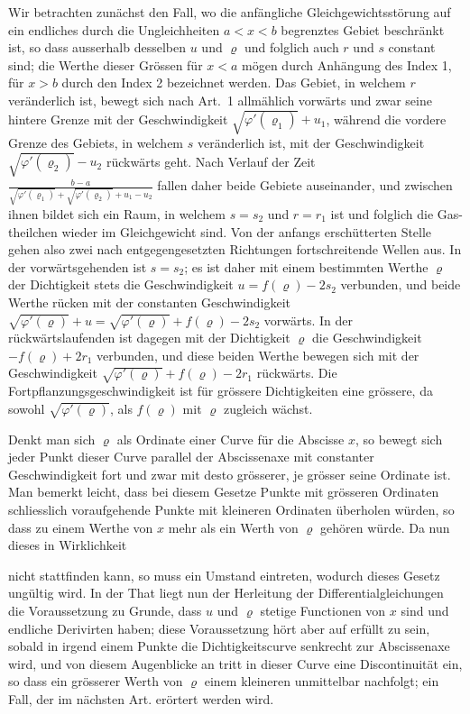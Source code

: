 \documentclass[12pt,a4paper]{book}
\theoremstyle{definition}
\theoremstyle{remark}
\begin{document}
Wir betrachten zun\"achst den Fall, wo die anf\"angliche Gleichgewichtsst\"orung auf ein endliches durch die Ungleichheiten $a < x < b$ begrenztes Gebiet beschr\"ankt ist, so dass ausserhalb desselben $u$ und $\varrho$ und folglich auch $r$ und $s$ constant sind; die Werthe dieser Gr\"ossen f\"ur $x < a$ m\"ogen durch Anh\"angung des Index 1, f\"ur $x > b$ durch den Index 2 bezeichnet werden. Das Gebiet, in welchem $r$ ver\"anderlich ist, bewegt sich nach Art.~1 allm\"ahlich vorw\"arts und zwar seine hintere Grenze mit der Geschwindigkeit $\sqrt{\varphi'(\varrho_{1})} + u_{1}$, w\"ahrend die vordere Grenze des Gebiets, in welchem $s$ ver\"anderlich ist, mit der Geschwindigkeit $\sqrt{\varphi'(\varrho_{2})} - u_{2}$ r\"uckw\"arts geht. Nach Verlauf der Zeit $\frac{b-a}{\sqrt{\varphi'(\varrho_{1})} + \sqrt{\varphi'(\varrho_{2})} + u_{1} - u_{2}}$ fallen daher beide Gebiete auseinander, und zwischen ihnen bildet sich ein Raum, in welchem $s = s_{2}$ und $r = r_{1}$ ist und folglich die Gas-theilchen wieder im Gleichgewicht sind. Von der anfangs ersch\"utterten Stelle gehen also zwei nach entgegengesetzten Richtungen fortschreitende Wellen aus. In der vorw\"artsgehenden ist $s = s_{2}$; es ist daher mit einem bestimmten Werthe $\varrho$ der Dichtigkeit stets die Geschwindigkeit $u = f(\varrho) - 2s_{2}$ verbunden, und beide Werthe r\"ucken mit der constanten Geschwindigkeit $\sqrt{\varphi'(\varrho)} + u = \sqrt{\varphi'(\varrho)} + f(\varrho) - 2s_{2}$ vorw\"arts. In der r\"uckw\"artslaufenden ist dagegen mit der Dichtigkeit $\varrho$ die Geschwindigkeit $-f(\varrho) + 2r_{1}$ verbunden, und diese beiden Werthe bewegen sich mit der Geschwindigkeit $\sqrt{\varphi'(\varrho)} + f(\varrho) - 2r_{1}$ r\"uckw\"arts. Die Fortpflanzungsgeschwindigkeit ist f\"ur gr\"ossere Dichtigkeiten eine gr\"ossere, da sowohl $\sqrt{\varphi'(\varrho)}$, als $f(\varrho)$ mit $\varrho$ zugleich w\"achst.

Denkt man sich $\varrho$ als Ordinate einer Curve f\"ur die Abscisse $x$, so bewegt sich jeder Punkt dieser Curve parallel der Abscissenaxe mit constanter Geschwindigkeit fort und zwar mit desto gr\"osserer, je gr\"osser seine Ordinate ist. Man bemerkt leicht, dass bei diesem Gesetze Punkte mit gr\"osseren Ordinaten schliesslich voraufgehende Punkte mit kleineren Ordinaten \"uberholen w\"urden, so dass zu einem Werthe von $x$ mehr als ein Werth von $\varrho$ geh\"oren w\"urde. Da nun dieses in Wirklichkeit

nicht stattfinden kann, so muss ein Umstand eintreten, wodurch dieses Gesetz ung\"ultig wird. In der That liegt nun der Herleitung der Differentialgleichungen die Voraussetzung zu Grunde, dass $u$ und $\varrho$ stetige Functionen von $x$ sind und endliche Derivirten haben; diese Voraussetzung h\"ort aber auf erf\"ullt zu sein, sobald in irgend einem Punkte die Dichtigkeitscurve senkrecht zur Abscissenaxe wird, und von diesem Augenblicke an tritt in dieser Curve eine Discontinuit\"at ein, so dass ein gr\"osserer Werth von $\varrho$ einem kleineren unmittelbar nachfolgt; ein Fall, der im n\"achsten Art. er\"ortert werden wird.
\end{document}
